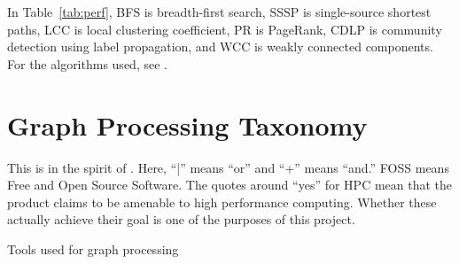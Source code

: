 \documentclass{sig-alternate}
\begin{document}
In Table~\ref{tab:perf}, BFS is breadth-first search, SSSP is single-source shortest paths, LCC is local clustering coefficient, PR is PageRank, CDLP is community detection using label propagation, and WCC is weakly connected components. For the algorithms used, see \cite{Iosup:2016:Graphalyticstech}.

\begin{table}[!htb]
	\centering

		\centering
	\caption{Performance Results for the \texttt{dota-league} dataset with 61,670 vertices and 50,870,313 edges.}
	\label{tab:perf}
\end{table}

\section{Graph Processing Taxonomy}
This is in the spirit of \cite{Doekemeijer:2015:GPFSurvey}. Here, ``|'' means ``or'' and ``+'' means ``and.'' FOSS means Free and Open Source Software. The quotes around ``yes'' for HPC mean that the product claims to be amenable to high performance computing. Whether these actually achieve their goal is one of the purposes of this project.
\begin{table*}[t]
	\begin{minipage}{\linewidth} %
		\centering
		\caption{Tools used for graph processing}
		\label{tab:frameworks}
	\end{minipage}
\end{table*}
\end{document}
